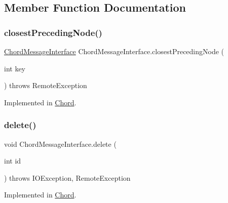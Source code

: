 \subsection{Member Function Documentation}
\hypertarget{interface_chord_message_interface_a7f47e9d5144a2af6904135bc05dfe8fd}{}\label{interface_chord_message_interface_a7f47e9d5144a2af6904135bc05dfe8fd} 
\subsubsection{\texorpdfstring{closest\+Preceding\+Node()}{closestPrecedingNode()}}
{\footnotesize\ttfamily \hyperlink{interface_chord_message_interface}{Chord\+Message\+Interface} Chord\+Message\+Interface.\+closest\+Preceding\+Node (\begin{DoxyParamCaption}\item[{int}]{key }\end{DoxyParamCaption}) throws Remote\+Exception}



Implemented in \hyperlink{class_chord_a77a9443c945cf5482f59edf685c1dc70}{Chord}.

\hypertarget{interface_chord_message_interface_ab4d46beae8cea347c827b5618ea16104}{}\label{interface_chord_message_interface_ab4d46beae8cea347c827b5618ea16104} 
\subsubsection{\texorpdfstring{delete()}{delete()}}
{\footnotesize\ttfamily void Chord\+Message\+Interface.\+delete (\begin{DoxyParamCaption}\item[{int}]{id }\end{DoxyParamCaption}) throws I\+O\+Exception, Remote\+Exception}



Implemented in \hyperlink{class_chord_a83d9245c283baf440dc847cee154c8c6}{Chord}.

\hypertarget{interface_chord_message_interface_a4cdb461c48fe643f4fb5fa420d017eb3}{}\label{interface_chord_message_interface_a4cdb461c48fe643f4fb5fa420d017eb3} 
